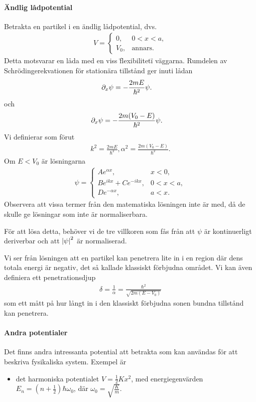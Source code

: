 \paragraph{Ändlig lådpotential}
Betrakta en partikel i en ändlig lådpotential, dvs.
\begin{align*}
	V = 
	\begin{cases}
		0,      &0 < x < a, \\
		V_{0},  &\text{annars.}
	\end{cases}
\end{align*}
Detta motsvarar en låda med en viss \"flexibilitet\" i väggarna. Rumdelen av Schrödingerekvationen för stationära tillstånd ger inuti lådan
\begin{align*}
	\partial_{x}\psi                      &= -\frac{2mE}{\hbar^{2}}\psi.
\end{align*}
och
\begin{align*}
	\partial_{x}\psi                      &= -\frac{2m(V_{0} - E)}{\hbar^{2}}\psi.
\end{align*}
Vi definierar som förut
\begin{align*}
	k^{2} = \frac{2mE}{\hbar^{2}}, \alpha^{2} = \frac{2m(V_{0} - E)}{\hbar^{2}}.
\end{align*}
Om $E < V_{0}$ är lösningarna
\begin{align*}
	\psi =
	\begin{cases}
		Ae^{\alpha x},        &x < 0, \\
		Be^{ikx} + Ce^{-ikx}, &0 < x < a, \\
		De^{-\alpha x},       &a < x.
	\end{cases}
\end{align*}
Observera att vissa termer från den matematiska lösningen inte är med, då de skulle ge lösningar som inte är normaliserbara.

För att lösa detta, behöver vi de tre villkoren som fås från att $\psi$ är kontinuerligt deriverbar och att $\abs{\psi}^{2}$ är normaliserad.

Vi ser från lösningen att en partikel kan penetrera lite in i en region där dens totala energi är negativ, det så kallade klassiskt förbjudna området. Vi kan även definiera ett penetrationsdjup
\begin{align*}
	\delta = \frac{1}{\alpha} = \frac{\hbar^{2}}{\sqrt{2m(E - V_{0})}}
\end{align*}
som ett mått på hur långt in i den klassiskt förbjudna sonen bundna tillstånd kan penetrera.

\paragraph{Andra potentialer}
Det finns andra intressanta potential att betrakta som kan användas för att beskriva fysikaliska system. Exempel är
\begin{itemize}
	\item det harmoniska potentialet $V = \frac{1}{2}Kx^{2}$, med energiegenvärden $E_{n} = \left(n + \frac{1}{2}\right)\hbar\omega_{0}$, där $\omega_{0} = \sqrt{\frac{K}{m}}$.
\end{itemize}

